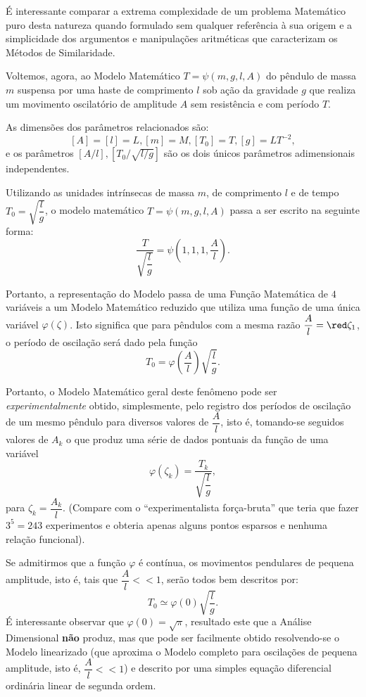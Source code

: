     É interessante comparar a extrema complexidade de um problema Matemático puro desta natureza quando formulado sem qualquer referência à sua origem e a simplicidade dos argumentos e manipulações aritméticas que caracterizam os Métodos de Similaridade.

    Voltemos, agora, ao Modelo Matemático \(T = \psi(m, g, l, A)\) do pêndulo de massa \(m\) suspensa por uma haste de comprimento \(l\) sob ação da gravidade \(g\) que realiza um movimento oscilatório de amplitude \(A\) sem resistência e com período \(T\).

    As dimensões dos parâmetros relacionados são:
    \[[A] = [l] = L, [m] = M, [T_{0}] = T, [g] = LT^{-2},\]
    {\red e os parâmetros \([A/l], [T_0/\sqrt{l/g}]\) são os dois únicos parâmetros adimensionais independentes}.
    
    Utilizando as unidades intrínsecas de massa \(m\), de comprimento \(l\) e de tempo \(T_{0} = \sqrt{\dfrac{l}{g}}\), o modelo matemático \(T = \psi(m, g, l, A)\) passa a ser escrito na seguinte forma:
    \[\dfrac{T}{\sqrt{\dfrac{l}{g}}} = \psi\left(1, 1, 1, \dfrac{A}{l}\right).\]

    Portanto, a representação do Modelo passa de uma Função Matemática de \(4\) variáveis a um Modelo Matemático reduzido que utiliza uma função de uma única variável \(\varphi(\zeta)\). Isto significa que para pêndulos com a mesma razão \(\dfrac{A}{l} = {\red \zeta_{1}}\), o período de oscilação será dado pela função
    \[T_{0} = \varphi\left(\dfrac{A}{l}\right) \sqrt{\dfrac{l}{g}}.\]

    Portanto, o Modelo Matemático geral deste fenômeno pode ser \textit{experimentalmente} obtido, simplesmente, pelo registro dos períodos de oscilação de um mesmo pêndulo para diversos valores de \(\dfrac{A}{l}\), isto é, tomando-se seguidos valores de \(A_{k}\) o que produz uma série de dados pontuais da função de uma variável
    \[\varphi(\zeta_{k}) = \dfrac{T_{k}}{\sqrt{\dfrac{l}{g}}},\]
    para \(\zeta_{k} =\dfrac{A_{k}}{l}\). (Compare com o ``experimentalista força-bruta'' que teria que fazer \(3^5 = 243\) experimentos e obteria apenas alguns pontos esparsos e nenhuma relação funcional).

    Se admitirmos que a função \(\varphi\) é contínua, os movimentos pendulares de pequena amplitude, isto é, tais que \(\dfrac{A}{l} << 1\), serão todos bem descritos por:
    \[T_{0} \simeq \varphi(0) \sqrt{\dfrac{l}{g}}.\]
    É interessante observar que \(\varphi(0) = \sqrt{\pi}\), resultado este que a Análise Dimensional \textbf{não} produz, mas que pode ser facilmente obtido resolvendo-se o Modelo linearizado (que aproxima o Modelo completo para oscilações de pequena amplitude, isto é, \(\dfrac{A}{l} << 1\)) e descrito por uma simples equação diferencial ordinária linear de segunda ordem.

